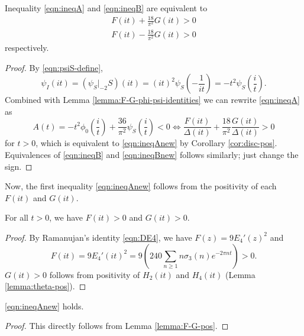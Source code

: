 \begin{lemma}\label{lemma:ineqABnew-equiv}
Inequality \eqref{eqn:ineqA} and \eqref{eqn:ineqB} are equivalent to
\begin{align}
  F(it) + \frac{18}{\pi^2} G(it) > 0 \label{eqn:ineqAnew} \\
  F(it) - \frac{18}{\pi^2} G(it) > 0 \label{eqn:ineqBnew}
\end{align}
respectively.
\end{lemma}
\begin{proof}
By \eqref{eqn:psiS-define},
\begin{equation}
  \psi_I(it) = (\psi_S|_{-2}S)(it) = (it)^{2}\psi_S\left(-\frac{1}{it}\right) = -t^2 \psi_S\left(\frac{i}{t}\right).
\end{equation}
Combined with Lemma \ref{lemma:F-G-phi-psi-identities} we can rewrite \eqref{eqn:ineqA} as
\begin{equation}
  A(t) = -t^2 \phi_0\left(\frac{i}{t}\right) + \frac{36}{\pi^2} \psi_S\left(\frac{i}{t}\right) < 0 \Leftrightarrow \frac{F(it)}{\Delta(it)} + \frac{18}{\pi^2} \frac{G(it)}{\Delta(it)} > 0
\end{equation}
for $t > 0$, which is equivalent to \eqref{eqn:ineqAnew} by Corollary \ref{cor:disc-pos}.
Equivalences of \eqref{eqn:ineqB} and \eqref{eqn:ineqBnew} follows similarly; just change the sign.
\end{proof}


Now, the first inequality \eqref{eqn:ineqAnew} follows from the positivity of each $F(it)$ and $G(it)$.

\begin{lemma}\label{lemma:F-G-pos}
For all $t > 0$, we have $F(it) > 0$ and $G(it) > 0$.
\end{lemma}
\begin{proof}
By Ramanujan's identity \eqref{eqn:DE4}, we have $F(z) = 9 E_4'(z)^2$ and
\begin{equation}
  F(it) = 9E_4'(it)^2 = 9 \left(240\sum_{n \geq 1} n \sigma_3(n) e^{-2 \pi n t} \right) > 0.
\end{equation}
$G(it) > 0$ follows from positivity of $H_2(it)$ and $H_4(it)$ (Lemma \ref{lemma:theta-pos}).
\end{proof}

\begin{corollary}\label{cor:ineqAnew}
\eqref{eqn:ineqAnew} holds.
\end{corollary}
\begin{proof}
This directly follows from Lemma \ref{lemma:F-G-pos}.
\end{proof}


